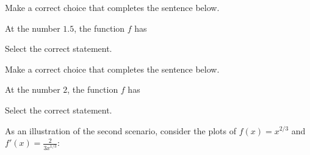 \documentclass{ximera}
\begin{document}
\begin{question}

 Make a correct choice that completes the sentence below. 
 
  At the number $1.5$, the function $f$ has 

  \begin{multipleChoice}
  \end{multipleChoice}
  \end{question}
  \begin{question}
Select the correct statement.
  \begin{multipleChoice}
  \end{multipleChoice}
\end{question}

\begin{question}

 Make a correct choice that completes the sentence below. 
 
  At the number $2$, the  function $f$ has 

  \begin{multipleChoice}
  \end{multipleChoice}
  \end{question}



  \begin{question}

Select the correct statement.
  \begin{multipleChoice}
  \end{multipleChoice}
\end{question}

 As an illustration of the second scenario, consider the plots of $f(x) = x^{2/3}$ and $f'(x) = \frac{2}{3x^{1/3}}$:
\end{document}
